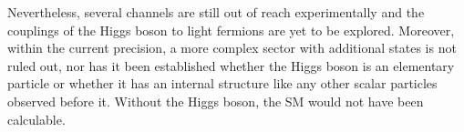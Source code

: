 
Nevertheless, several channels are still out of reach experimentally and the couplings of the Higgs boson to light fermions are yet to be explored.
Moreover, within the current precision, a more complex sector with additional states is not ruled out, nor has it been established whether the Higgs boson is an elementary particle or whether it has an internal structure like any other scalar particles observed before it.
Without the Higgs boson, the SM would not have been calculable.
